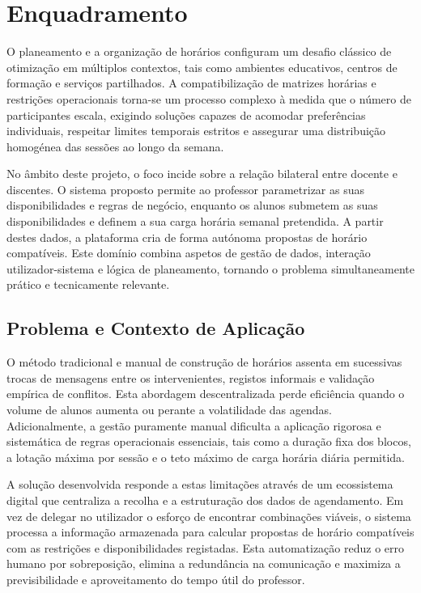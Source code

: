 %
%
\chapter{Enquadramento} \label{cap:enquadramento}
O planeamento e a organização de horários configuram um desafio clássico de otimização em múltiplos contextos, tais como ambientes educativos, centros de formação e serviços partilhados. A compatibilização de matrizes horárias e restrições operacionais torna-se um processo complexo à medida que o número de participantes escala, exigindo soluções capazes de acomodar preferências individuais, respeitar limites temporais estritos e assegurar uma distribuição homogénea das sessões ao longo da semana.

No âmbito deste projeto, o foco incide sobre a relação bilateral entre docente e discentes. O sistema proposto permite ao professor parametrizar as suas disponibilidades e regras de negócio, enquanto os alunos submetem as suas disponibilidades e definem a sua carga horária semanal pretendida. A partir destes dados, a plataforma cria de forma autónoma propostas de horário compatíveis.
Este domínio combina aspetos de gestão de dados, interação utilizador-sistema e lógica de planeamento, tornando o problema simultaneamente prático e tecnicamente relevante.

\section{Problema e Contexto de Aplicação}

O método tradicional e manual de construção de horários assenta em sucessivas trocas de mensagens entre os intervenientes, registos informais e validação empírica de conflitos. Esta abordagem descentralizada perde eficiência quando o volume de alunos aumenta ou perante a volatilidade das agendas. Adicionalmente, a gestão puramente manual dificulta a aplicação rigorosa e sistemática de regras operacionais essenciais, tais como a duração fixa dos blocos, a lotação máxima por sessão e o teto máximo de carga horária diária permitida.

A solução desenvolvida responde a estas limitações através de um ecossistema digital que centraliza a recolha e a estruturação dos dados de agendamento. Em vez de delegar no utilizador o esforço de encontrar combinações viáveis, o sistema processa a informação armazenada para calcular propostas de horário compatíveis com as restrições e disponibilidades registadas. Esta automatização reduz o erro humano por sobreposição, elimina a redundância na comunicação e maximiza a previsibilidade e aproveitamento do tempo útil do professor.

